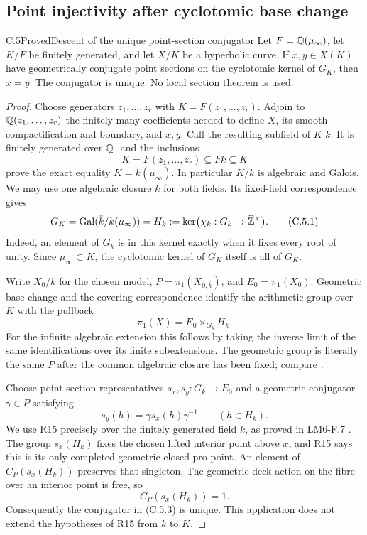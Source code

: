 \subsection{Point injectivity after cyclotomic base change}

\begin{statement}{C.5}{Proved}{Descent of the unique point-section conjugator}
Let $F=\mathbb Q(\mu_\infty)$, let $K/F$ be finitely generated, and let
$X/K$ be a hyperbolic curve. If $x,y\in X(K)$ have geometrically
conjugate point sections on the cyclotomic kernel of $G_K$, then $x=y$.
The conjugator is unique. No local section theorem is used.
\end{statement}
\begin{proof}
Choose generators $z_1,\ldots,z_r$ with $K=F(z_1,\ldots,z_r)$.
Adjoin to $\mathbb Q(z_1,\ldots,z_r)$ the finitely many coefficients needed
to define $X$, its smooth compactification and boundary, and $x,y$.
Call the resulting subfield of $K$ $k$. It is finitely generated over
$\mathbb Q$, and the inclusions
\[
 K=F(z_1,\ldots,z_r)\subseteq Fk\subseteq K
\]
prove the exact equality $K=k(\mu_\infty)$. In particular $K/k$ is
algebraic and Galois. We may use one algebraic closure $\bar k$ for
both fields. Its fixed-field correspondence gives
\[
 G_K=\operatorname{Gal}(\bar k/k(\mu_\infty))
     =H_k:=\ker\bigl(\chi_k:G_k\to\widehat{\mathbb Z}^{\times}\bigr).
 \tag{C.5.1}
\]
Indeed, an element of $G_k$ is in this kernel exactly when it fixes
every root of unity. Since $\mu_\infty\subset K$, the cyclotomic
kernel of $G_K$ itself is all of $G_K$.

Write $X_0/k$ for the chosen model, $P=\pi_1(X_{0,\bar k})$, and
$E_0=\pi_1(X_0)$. Geometric base change and the covering
correspondence identify the arithmetic group over $K$ with the
pullback
\[
 \pi_1(X)=E_0\times_{G_k}H_k.
 \tag{C.5.2}
\]
For the infinite algebraic extension this follows by taking the
inverse limit of the same identifications over its finite subextensions.
The geometric group is literally the same $P$ after the common
algebraic closure has been fixed; compare
\cite[Expos\'e IX, \S6]{AgentSGA1}.

Choose point-section representatives $s_x,s_y:G_k\to E_0$ and a
geometric conjugator $\gamma\in P$ satisfying
\[
 s_y(h)=\gamma s_x(h)\gamma^{-1}\qquad(h\in H_k).
 \tag{C.5.3}
\]
We use R15 precisely over the finitely generated field $k$, as
proved in LM6-F.7 \cite[F.7]{AgentLM6}. The group $s_x(H_k)$ fixes
the chosen lifted interior point above $x$, and R15 says this is its
only completed geometric closed pro-point. An element of
$C_P(s_x(H_k))$ preserves that singleton. The geometric deck action
on the fibre over an interior point is free, so
\[
 C_P(s_x(H_k))=1.
 \tag{C.5.4}
\]
Consequently the conjugator in (C.5.3) is unique. This application
does not extend the hypotheses of R15 from $k$ to $K$.


\end{proof}
